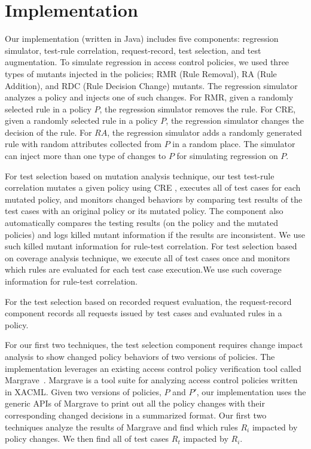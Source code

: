 \section{Implementation} \label{sec:implementation}

Our implementation (written in Java) includes five components: regression simulator, test-rule correlation, request-record, test selection,
and test augmentation. To simulate regression in access control policies, 
we used three types of mutants injected in the policies; RMR (Rule Removal), RA (Rule Addition), and RDC (Rule Decision Change)
mutants. The regression simulator analyzes a policy and injects one
of such changes. For RMR, given a randomly selected rule in a policy $P$,
the regression simulator removes the rule. For CRE,
given a randomly selected rule in a policy $P$, the regression simulator changes
the decision of the rule.
For $RA$, the regression simulator adds a randomly generated
rule with random attributes collected from $P$ in a random place.
The simulator can inject more than one type of changes to $P$ for simulating
regression on $P$.

For test selection based on mutation analysis technique,
our test test-rule correlation mutates a given policy using CRE
, executes all of test cases for each mutated policy, and monitors changed
behaviors by comparing test results of the test cases with an original policy or its mutated policy.
The component also automatically compares the testing results (on the policy and the mutated
policies) and logs killed mutant information if the results are inconsistent. We use
such killed mutant information for rule-test correlation.
For test selection based on coverage analysis technique,
we execute  all of test cases once and monitors
which rules are evaluated for each test case execution.We use such
coverage information for rule-test correlation.

For the test selection based on recorded request evaluation,
the request-record component records all requests issued by test cases and evaluated rules in a policy.

For our first two techniques, the test selection component requires change impact analysis to
show changed policy behaviors of two versions of policies.
The implementation leverages an existing access control policy verification tool called Margrave~\cite{fisler05:verification}. Margrave is a tool suite for analyzing access control policies written in XACML.
Given two versions of policies, $P$ and $P'$, 
our implementation uses the generic APIs of Margrave to
print out all the policy changes with their corresponding changed decisions in a summarized format.
Our first two techniques analyze the results of Margrave and
find which rules $R_i$ impacted by policy changes. We then find all of test cases $R_t$
impacted by $R_i$.

